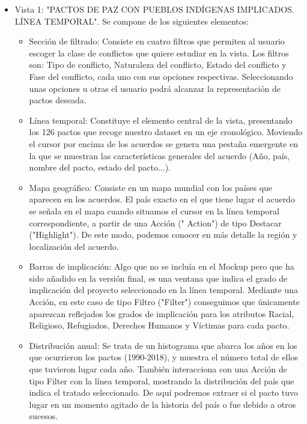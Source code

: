\documentclass[11pt]{article}
\begin{document}
\begin{itemize}
    \item Vista 1: "PACTOS DE PAZ CON PUEBLOS INDÍGENAS IMPLICADOS. LÍNEA TEMPORAL". Se compone de los siguientes elementos:
    \begin{itemize}
        \item Sección de filtrado: Consiste en cuatro filtros que permiten al usuario escoger la clase de conflictos que quiere estudiar en la vista. Los filtros son: Tipo de conflicto, Naturaleza del conflicto, Estado del conflicto y Fase del conflicto, cada uno con sus opciones respectivas. Seleccionando unas opciones u otras el usuario podrá alcanzar la representación de pactos deseada.
        
        \item Línea temporal: Constituye el elemento central de la vista, presentando los 126 pactos que recoge nuestro dataset en un eje cronológico. Moviendo el cursor por encima de los acuerdos se genera una pestaña emergente en la que se muestran las características generales del acuerdo (Año, país, nombre del pacto, estado del pacto...).
        
        \item Mapa geográfico: Consiste en un mapa mundial con los países que aparecen en los acuerdos. El país exacto en el que tiene lugar el acuerdo se señala en el mapa cuando situamos el cursor en la línea temporal correspondiente, a partir de una Acción (" Action") de tipo Destacar ("Highlight"). De este modo, podemos conocer en más detalle la región y localización del acuerdo.
        
        \item Barras de implicación: Algo que no se incluía en el Mockup pero que ha sido añadido en la versión final, es una ventana que indica el grado de implicación del proyecto seleccionado en la línea temporal. Mediante una Acción, en este caso de tipo Filtro ("Filter") conseguimos que únicamente aparezcan reflejados los grados de implicación para los atributos Racial, Religioso, Refugiados, Derechos Humanos y Víctimas para cada pacto.
        
        \item Distribución anual: Se trata de un histograma que abarca los años en los que ocurrieron los pactos (1990-2018), y muestra el número total de ellos que tuvieron lugar cada año. También interacciona con una Acción de tipo Filter con la línea temporal, mostrando la distribución del país que indica el tratado seleccionado. De aquí podremos extraer si el pacto tuvo lugar en un momento agitado de la historia del país o fue debido a otros sucesos. 
    \end{itemize}
    

\end{itemize}
\end{document}
